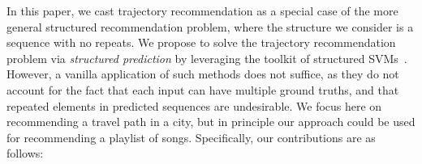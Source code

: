 In this paper, we cast trajectory recommendation as a special case of the more general
structured recommendation problem, where the structure we consider is a sequence with no repeats.
We propose to solve the trajectory recommendation problem
via \emph{structured prediction} by leveraging the toolkit of structured
SVMs~\citep{taskar2004max,tsochantaridis2004support}.
However, a vanilla application of such methods does not suffice,
as they do not account for the fact that each input can have multiple ground truths,
and that repeated elements in predicted sequences are undesirable.
We focus here on recommending a travel path in a city, but in principle our approach could be
used for recommending a playlist of songs.
Specifically, our contributions are as follows:
